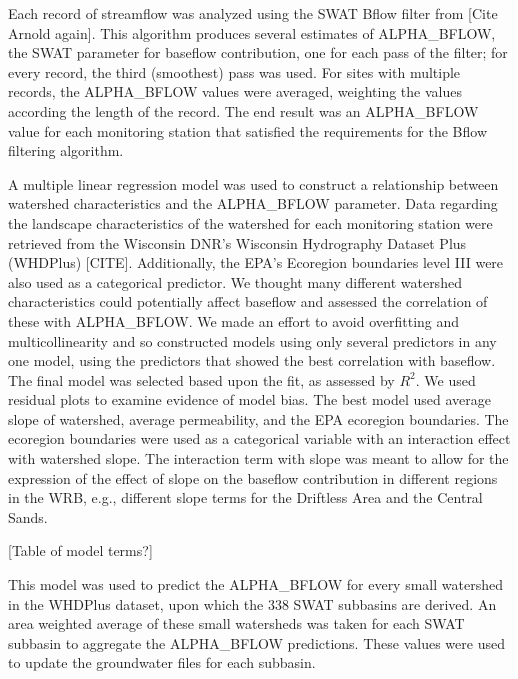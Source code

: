 	Each record of streamflow was analyzed using the SWAT Bflow filter from [Cite Arnold again]. This algorithm produces several estimates of ALPHA\_BFLOW, the SWAT parameter for baseflow contribution, one for each pass of the filter; for every record, the third (smoothest) pass was used. For sites with multiple records, the ALPHA\_BFLOW values were averaged, weighting the values according the length of the record. The end result was an ALPHA\_BFLOW value for each monitoring station that satisfied the requirements for the Bflow filtering algorithm.  

	A multiple linear regression model was used to construct a relationship between watershed characteristics and the ALPHA\_BFLOW parameter. Data regarding the landscape characteristics of the watershed for each monitoring station were retrieved from the Wisconsin DNR's Wisconsin Hydrography Dataset Plus (WHDPlus) [CITE]. Additionally, the EPA's Ecoregion boundaries level III were also used as a categorical predictor. We thought many different watershed characteristics could potentially affect baseflow and assessed the correlation of these with ALPHA\_BFLOW. We made an effort to avoid overfitting and multicollinearity and so constructed models using only several predictors in any one model, using the predictors that showed the best correlation with baseflow. The final model was selected based upon the fit, as assessed by $R^2$. We used residual plots to examine evidence of model bias. The best model used average slope of watershed, average permeability, and the EPA ecoregion boundaries. The ecoregion boundaries were used as a categorical variable with an interaction effect with watershed slope. The interaction term with slope was meant to allow for the expression of the effect of slope on the baseflow contribution in different regions in the WRB, e.g., different slope terms for the Driftless Area and the Central Sands. 
	
	[Table of model terms?]
	
	This model was used to predict the ALPHA\_BFLOW for every small watershed in the WHDPlus dataset, upon which the 338 SWAT subbasins are derived. An area weighted average of these small watersheds was taken for each SWAT subbasin to aggregate the ALPHA\_BFLOW predictions. These values were used to update the groundwater files for each subbasin.
